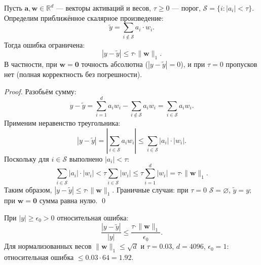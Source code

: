 \begin{theorem}
\label{thm:sparse-correct}
Пусть $\mathbf{a}, \mathbf{w} \in \mathbb{R}^d$ — векторы активаций
и весов, $\tau \geq 0$ — порог, $\mathcal{S} = \{i : |a_i| < \tau\}$.
Определим приближённое скалярное произведение:
\begin{equation}
  \tilde{y} = \sum_{i \notin \mathcal{S}} a_i \cdot w_i.
  \label{eq:approx-dot}
\end{equation}
Тогда ошибка ограничена:
\begin{equation}
  |y - \tilde{y}| \leq \tau \cdot \|\mathbf{w}\|_1.
  \label{eq:correct-bound}
\end{equation}
В частности, при $\mathbf{w} = \mathbf{0}$ точность абсолютна
($|y - \tilde{y}| = 0$), и при $\tau = 0$ пропусков нет
(полная корректность без погрешности).
\end{theorem}

\begin{proof}
Разобьём сумму:
\[
  y - \tilde{y}
  = \sum_{i=1}^{d} a_i w_i - \sum_{i \notin \mathcal{S}} a_i w_i
  = \sum_{i \in \mathcal{S}} a_i w_i.
\]
Применим неравенство треугольника:
\[
  |y - \tilde{y}|
  = \left|\sum_{i \in \mathcal{S}} a_i w_i\right|
  \leq \sum_{i \in \mathcal{S}} |a_i| \cdot |w_i|.
\]
Поскольку для $i \in \mathcal{S}$ выполнено $|a_i| < \tau$:
\[
  \sum_{i \in \mathcal{S}} |a_i| \cdot |w_i|
  < \tau \sum_{i \in \mathcal{S}} |w_i|
  \leq \tau \sum_{i=1}^{d} |w_i|
  = \tau \cdot \|\mathbf{w}\|_1.
\]
Таким образом, $|y - \tilde{y}| \leq \tau \cdot \|\mathbf{w}\|_1$.
Граничные случаи: при $\tau = 0$ $\mathcal{S} = \varnothing$,
$\tilde{y} = y$; при $\mathbf{w} = \mathbf{0}$ сумма равна нулю.
\qed
\end{proof}

\begin{corollary}
\label{cor:rel-error}
При $|y| \geq \epsilon_0 > 0$ относительная ошибка:
\[
  \frac{|y - \tilde{y}|}{|y|}
  \leq \frac{\tau \cdot \|\mathbf{w}\|_1}{\epsilon_0}.
\]
Для нормализованных весов $\|\mathbf{w}\|_1 \leq \sqrt{d}$
и $\tau = 0{.}03$, $d = 4096$, $\epsilon_0 = 1$:
относительная ошибка $\leq 0{.}03 \cdot 64 = 1{.}92$.
\end{corollary}

